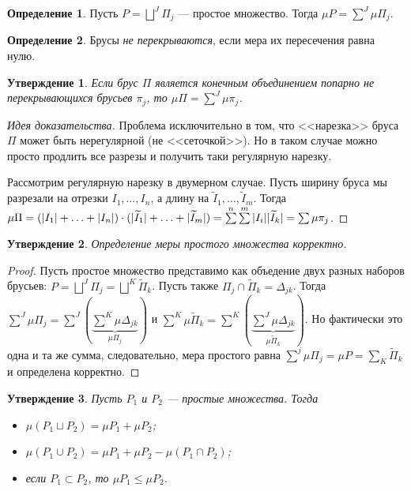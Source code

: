 \documentclass[a4paper,12pt]{article}
\newcommand*{\hm}[1]{#1\nobreak\discretionary{}
{\hbox{$\mathsurround=0pt #1$}}{}}
\theoremstyle{remark}
\theoremstyle{definition}
\newtheorem{Def}{Определение}
\theoremstyle{plain}
\newtheorem*{Statement}{Утверждение}
\newcommand{\0}{\vec{0}}
\renewcommand{\leq}{\leqslant}
\newcommand{\I}{\widetilde{I}}
\newcommand{\PPi}{\widetilde{\Pi}}
\begin{document}
\begin{Def}
Пусть $P = \bigsqcup\limits^J\Pi_j$ --- простое множество. Тогда $\mu P = \sum\limits^J \mu\Pi_j$.
\end{Def}

\begin{Def}
Брусы \textit{не перекрываются}, если мера их пересечения равна нулю.
\end{Def}

\begin{Statement}
Если брус $\Pi$ является конечным объединением попарно не перекрывающихся брусьев $\pi_j$, то $\mu \Pi = \sum\limits^J \mu \pi_j$.
\end{Statement}
\begin{proof}[Идея доказательства]
Проблема исключительно в том, что <<нарезка>> бруса $\Pi$ может быть нерегулярной (не <<сеточкой>>). Но в таком случае можно просто продлить все разрезы и получить таки регулярную нарезку.

Рассмотрим регулярную нарезку в двумерном случае. Пусть ширину бруса мы разрезали на отрезки $I_1, \ldots, I_n$, а длину на $\I_1, \ldots, \I_m$. Тогда $\mu\Pi = (|I_1| + \ldots + |I_n|) \cdot (|\I_1| + \ldots + |\I_m|) \hm= \sum\limits^n\sum\limits^m|I_i||\I_k| = \sum\mu\pi_j$.
\end{proof}

\begin{Statement}
Определение меры простого множества корректно.
\end{Statement}
\begin{proof}
Пусть простое множество представимо как объедение двух разных наборов брусьев: $P = \bigsqcup\limits^J\Pi_j = \bigsqcup\limits^K\PPi_k$. Пусть также $\Pi_j \cap \PPi_k = \Delta_{jk}$. Тогда $\sum\limits^J \mu\Pi_j = \sum\limits^J\left( \underbrace{\sum\limits^K \mu \Delta_{jk}}_{\mu\Pi_j}  \right)$ и $\sum\limits^K\mu \PPi_k = \sum\limits^K\left( \underbrace{\sum\limits^J\mu \Delta_{jk}}_{\mu\PPi_k} \right)$. Но фактически это одна и та же сумма, следовательно, мера простого равна $\sum\limits^j\mu\Pi_j = \mu P  = \sum\limits_K\PPi_k$ и определена корректно.
\end{proof}
\begin{Statement}
Пусть $P_1$ и $P_2$ --- простые множества. Тогда
\begin{itemize}
\item $\mu(P_1 \sqcup P_2) = \mu P_1 + \mu P_2$;
\item $\mu(P_1 \cup P_2) = \mu P_1 + \mu P_2 - \mu(P_1 \cap P_2)$;
\item если $P_1 \subset P_2$, то $\mu P_1 \leq \mu P_2$.
\end{itemize}
\end{Statement}
\end{document}
